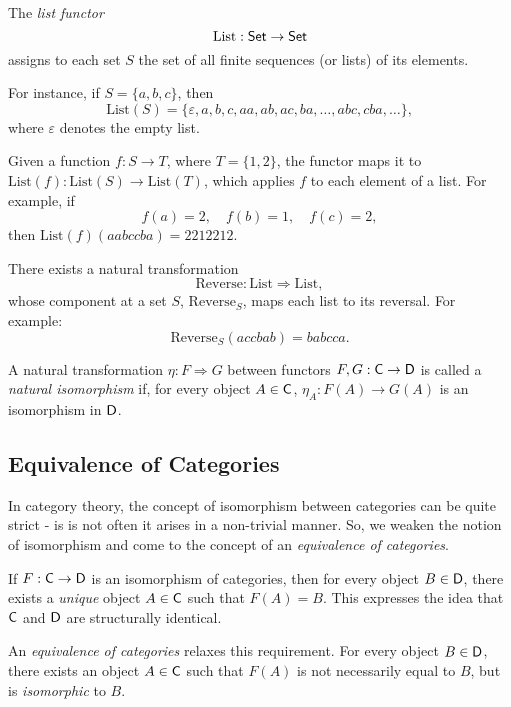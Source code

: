\begin{example}
The \emph{list functor}
\[
\mathrm{List} : \mathsf{Set} \to \mathsf{Set}
\]
assigns to each set \( S \) the set of all finite sequences (or lists) of its elements. 

For instance, if \( S = \{a, b, c\} \), then
\[
\mathrm{List}(S) = \{\varepsilon, a, b, c, aa, ab, ac, ba, \ldots, abc, cba, \ldots\},
\]
where \( \varepsilon \) denotes the empty list.

Given a function \( f : S \to T \), where $T=\{1,2\} $, the functor maps it to \(\mathrm{List}(f) : \mathrm{List}(S) \to \mathrm{List}(T)\), which applies \( f \) to each element of a list. For example, if
\[
f(a) = 2, \quad f(b) = 1, \quad f(c) = 2,
\]
then \(\mathrm{List}(f)(aabccba) = 2212212\).

There exists a natural transformation
\[
\mathrm{Reverse} : \mathrm{List} \Rightarrow \mathrm{List},
\]
whose component at a set \(S\), \(\mathrm{Reverse}_S\), maps each list to its reversal. For example:
\[
\mathrm{Reverse}_S(accbab) = babcca.
\]

\end{example}


\begin{definition}
  A natural transformation $\eta : F \Rightarrow G$ between functors $F, G : \mathsf{C} \to \mathsf{D}$ is called a \emph{natural isomorphism} if, for every object $A \in \mathsf{C}$,  $\eta_A : F(A) \to G(A)$ is an isomorphism in $\mathsf{D}$.
\end{definition}


\subsection{Equivalence of Categories}

In category theory, the concept of isomorphism between categories can be quite strict - is is not often it arises in a non-trivial manner. So, we weaken the notion of isomorphism and come to the concept of an \emph{equivalence of categories}.

If \( F: \mathsf{C} \to \mathsf{D} \) is an isomorphism of categories, then for every object \( B \in \mathsf{D} \), there exists a \emph{unique} object \( A \in \mathsf{C} \) such that \( F(A) = B \). This expresses the idea that \( \mathsf{C} \) and \( \mathsf{D} \) are structurally identical.

An \emph{equivalence of categories} relaxes this requirement. For every object \( B \in \mathsf{D} \), there exists an object \( A \in \mathsf{C} \) such that \( F(A) \) is not necessarily equal to \( B \), but is \emph{isomorphic} to \( B \). 

